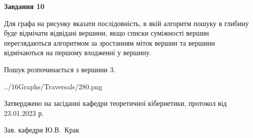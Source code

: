\documentclass[12pt, ukrainian]{article}
\begin{document}
{\begin {large}
{\begin {center}\textbf{Завдання 10}\end {center}}\par
Для графа на рисунку вказати послідовність, в якій алгоритм пошуку в глибину буде відмічати відвідані вершини, якщо списки суміжності вершин переглядаються алгоритмом за зростанням міток вершин та вершини відмічаються на першому вход\-женні у вершину.\par
Пошук розпочинається з вершини 3.\par

\begin{center}
	{../16Graphs/Traversals/280.png}
\end{center}\par
\newpage


\end {large}
}
{\smallskip \begin {small} Затверджено на засіданні кафедри теоретичної кібернетики, протокол  від   23.01.2023 р.\par\smallskip\smallskip
{\parbox {6.5 cm}{Зав. кафедри \dotfill Ю.В.~Крак}} \end{small}}
\end{document}
